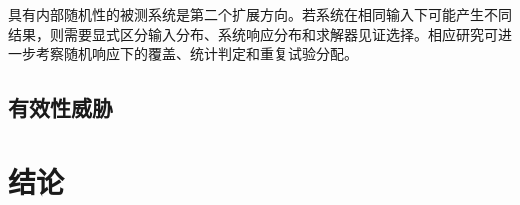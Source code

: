 \documentclass[UTF8, fontset=none, a4paper, 12pt]{ctexart}
\begin{document}
具有内部随机性的被测系统是第二个扩展方向。若系统在相同输入下可能产生不同结果，则需要显式区分输入分布、系统响应分布和求解器见证选择。相应研究可进一步考察随机响应下的覆盖、统计判定和重复试验分配。

\subsection{有效性威胁}


\section{结论}

\end{document}
